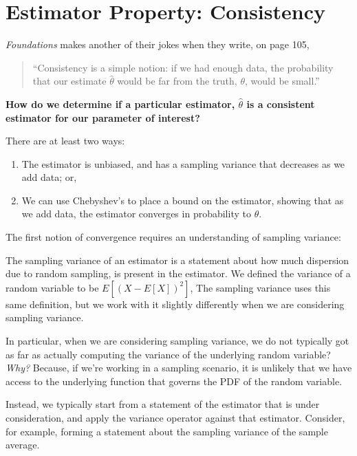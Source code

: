 \documentclass[
]{book}
\providecommand{\tightlist}{%
  \setlength{\itemsep}{0pt}\setlength{\parskip}{0pt}}
\theoremstyle{definition}
\theoremstyle{definition}
\theoremstyle{definition}
\theoremstyle{definition}
\theoremstyle{remark}
\begin{document}
\hypertarget{estimator-property-consistency}{%
\section{Estimator Property: Consistency}\label{estimator-property-consistency}}

\emph{Foundations} makes another of their jokes when they write, on page 105,

\begin{quote}
``Consistency is a simple notion: if we had enough data, the probability that our estimate \(\hat{\theta}\) would be far from the truth, \(\theta\), would be small.''
\end{quote}

\textbf{How do we determine if a particular estimator, \(\hat{\theta}\) is a consistent estimator for our parameter of interest?}

There are at least two ways:

\begin{enumerate}
\def\labelenumi{\arabic{enumi}.}
\tightlist
\item
  The estimator is unbiased, and has a sampling variance that decreases as we add data; or,
\item
  We can use Chebyshev's to place a bound on the estimator, showing that as we add data, the estimator converges in probability to \(\theta\).
\end{enumerate}

The first notion of convergence requires an understanding of sampling variance:

The sampling variance of an estimator is a statement about how much dispersion due to random sampling, is present in the estimator. We defined the variance of a random variable to be \(E\left[(X - E[X])^{2}\right]\), The sampling variance uses this same definition, but we work with it slightly differently when we are considering sampling variance.

In particular, when we are considering sampling variance, we do not typically got as far as actually computing the variance of the underlying random variable? \emph{Why?} Because, if we're working in a sampling scenario, it is unlikely that we have access to the underlying function that governs the PDF of the random variable.

Instead, we typically start from a statement of the estimator that is under consideration, and apply the variance operator against that estimator. Consider, for example, forming a statement about the sampling variance of the sample average.
\end{document}
